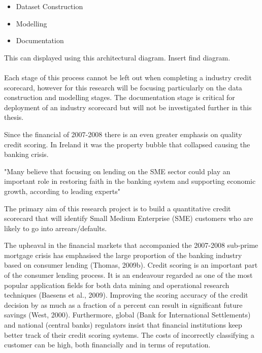 \begin{itemize}
	\item Dataset Construction
	\item Modelling
	\item Documentation 
\end{itemize}

This can displayed using this architectural diagram. Insert find diagram.
\\\\
Each stage of this process cannot be left out when completing a industry credit scorecard, however for this research will be focusing particularly on the data construction and modelling stages. The documentation stage is critical for deployment of an industry scorecard but will not be investigated further in this thesis. 

%	

Since the financial of 2007-2008 there is an even greater emphasis on quality credit scoring. In Ireland it was the property bubble that collapsed causing the banking crisis. 

"Many believe that focusing on lending on the SME sector could play an important role in restoring faith in the banking system and supporting economic growth, according to leading experts"


The primary aim of this research project is to build a quantitative credit scorecard that will identify Small Medium Enterprise (SME) customers who are likely to go into arrears/defaults.


The upheaval in the financial markets that accompanied the 2007-2008 sub-prime
mortgage crisis has emphasised the large proportion of the banking industry based
on consumer lending (Thomas, 2009b). Credit scoring is an important part of the
consumer lending process. It is an endeavour regarded as one of the most popular
application fields for both data mining and operational research techniques (Baesens
et al., 2009). Improving the scoring accuracy of the credit decision by as much as
a fraction of a percent can result in significant future savings (West, 2000). Furthermore,
global (Bank for International Settlements) and national (central banks)
regulators insist that financial institutions keep better track of their credit scoring
systems. The costs of incorrectly classifying a customer can be high, both financially
and in terms of reputation.


